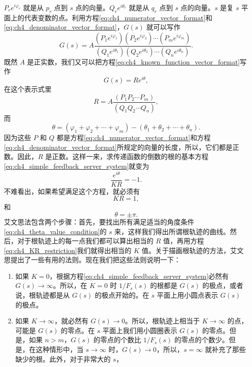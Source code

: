 $P_r e^{i \varphi_r}$ 就是从 $p_r$ 点到 $s$ 点的向量。$Q_r e^{i \theta_r}$ 就是从 $q_r$ 点到 $s$ 点的向量。$s$ 是复 $s$ 平面上的代表变数的点。利用方程\eqref{eq:ch4_numerator_vector_format}和\eqref{eq:ch4_denominator_vector_format}，$G(s)$ 就可以写作
\begin{equation}\label{eq:ch4_known_function_vector_format}
G(s) = A \frac{(P_1 e^{i \varphi_1}) (P_2 e^{i \varphi_2}) \cdots (P_m e^{i \varphi_m})}{(Q_1 e^{i \theta_1}) (Q_2 e^{i \theta_2}) \cdots (Q_n e^{i \theta_n})}.
\end{equation}
既然 $A$ 是正实数，我们又可以把方程\eqref{eq:ch4_known_function_vector_format}写作
\begin{equation}
G(s) = Re^{i\theta},
\end{equation}
在这个表示式里
\begin{equation}
R = A \frac{(P_1 P_2 \cdots P_m)}{(Q_1 Q_2 \cdots Q_n)},
\end{equation}
而
\begin{equation}
\theta = (\varphi_1 + \varphi_2 + \cdots + \varphi_m) - (\theta_1 + \theta_2 + \cdots + \theta_n).
\end{equation}
因为这些 $P$ 和 $Q$ 都是方程\eqref{eq:ch4_numerator_vector_format}和方程\eqref{eq:ch4_denominator_vector_format}所规定的向量的长度，所以，它们都是正数。因此，$R$ 是正数。这样一来，求传递函数的倒数的根的基本方程\eqref{eq:ch4_simple_feedback_server_system}就变为
\begin{equation*}
\frac{e^{i\theta}}{KR} = -1.
\end{equation*}
不难看出，如果希望满足这个方程，就必须有
\begin{equation}\label{eq:ch4_KR_restriction}
KR = 1,
\end{equation}
和
\begin{equation}\label{eq:ch4_theta_value_condition}
\theta = \pm \pi.
\end{equation}
艾文思法包含两个步骤：首先，要找出所有满足适当的角度条件\eqref{eq:ch4_theta_value_condition}的 $s$ 来，这样我们得出所谓根轨迹的曲线。然后，对于根轨迹上的每一点我们都可以算出相当的 $R$ 值，再用方程\eqref{eq:ch4_KR_restriction}我们就得出相当的 $K$ 值。关于描画根轨迹的方法，艾文思提出了一些有用的法则。现在我们把这些法则说明一下：

\begin{enumerate}[label=法则 \arabic*, start=1]
\item \label{ch4_law_1} 如果 $K = 0$，根据方程\eqref{eq:ch4_simple_feedback_server_system}必然有 $G(s) \to \infty$。所以，在 $K = 0$ 时 $1/F_s(s)$ 的根都是 $G(s)$ 的极点，或者说，根轨迹都是从 $G(s)$ 的极点开始的。在 $s$ 平面上用小圆点表示 $G(s)$ 的极点。

\item \label{ch4_law_2} 如果 $K \to \infty$，就必然有 $G(s) \to 0$。所以，根轨迹上相当于 $K \to \infty$ 的点，可能是 $G(s)$ 的零点。在 $s$ 平面上我们用小圆圈表示 $G(s)$ 的零点。但是，如果 $n > m$，$G(s)$ 的零点的个数比 $1/F_s(s)$ 的零点的个数少。但是，在这种情形中，当 $s \to \infty$ 时，$G(s) \to 0$，所以，$s = \infty$ 就补充了那些缺少的根。此外，对于非常大的 $s$，
\end{enumerate}

